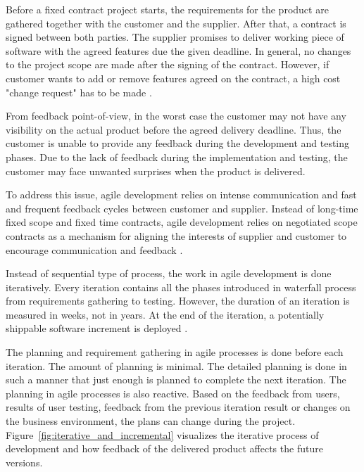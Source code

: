 \documentclass[english,12pt,a4paper,pdftex]{article}
\begin{document}
Before a fixed contract project starts, the requirements for the product are gathered together with the customer and the supplier. After that, a contract is signed between both parties. The supplier promises to deliver working piece of software with the agreed features due the given deadline. In general, no changes to the project scope are made after the signing of the contract. However, if customer wants to add or remove features agreed on the contract, a high cost "change request" has to be made \citep{beck2004}. 

From feedback point-of-view, in the worst case the customer may not have any visibility on the actual product before the agreed delivery deadline. Thus, the customer is unable to provide any feedback during the development and testing phases. Due to the lack of feedback during the implementation and testing, the customer may face unwanted surprises when the product is delivered.

To address this issue, agile development relies on intense communication and fast and frequent feedback cycles between customer and supplier. Instead of long-time fixed scope and fixed time contracts, agile development relies on negotiated scope contracts as a mechanism for aligning the interests of supplier and customer to encourage communication and feedback \citep{beck2004}.

Instead of sequential type of process, the work in agile development is done iteratively. Every iteration contains all the phases introduced in waterfall process from requirements gathering to testing. However, the duration of an iteration is measured in weeks, not in years. At the end of the iteration, a potentially shippable software increment is deployed \citep{shore2007}.

The planning and requirement gathering in agile processes is done before each iteration. The amount of planning is minimal. The detailed planning is done in such a manner that just enough is planned to complete the next iteration. The planning in agile processes is also reactive. Based on the feedback from users, results of user testing, feedback from the previous iteration result or changes on the business environment, the plans can change during the project. Figure~\ref{fig:iterative_and_incremental} visualizes the iterative process of development and how feedback of the delivered product affects the future versions.
\end{document}
